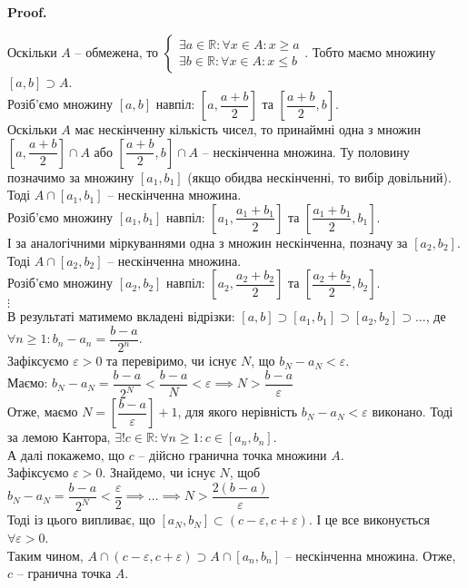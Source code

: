 \documentclass[a4paper, 14pt]{article}
\makeatletter
\def\qed{$\blacksquare$}
\theoremstyle{theoremdd}
\theoremstyle{theoremdd}
\theoremstyle{theoremdd}
\theoremstyle{theoremdd}
\theoremstyle{theoremdd}
\theoremstyle{theoremdd}
\theoremstyle{theoremdd}
\theoremstyle{theoremdd}
\renewenvironment{proof}[1][Proof.\\]{\par
\pushQED{\hfill \qed}%
\normalfont \topsep6\p@\@plus6\p@\relax
\trivlist
\item\relax
{\bfseries
#1\@addpunct{.}}\hspace\labelsep\ignorespaces
}{%
\popQED\endtrivlist\@endpefalse
}
\makeatother
\begin{document}
	\begin{proof}
	Оскільки $A$ -- обмежена, то
	$\begin{cases} \exists a \in \mathbb{R}: \forall x \in A: x \geq a \\
	  \exists b \in \mathbb{R}: \forall x \in A: x \leq b \end{cases}$. Тобто маємо множину $[a,b] \supset A$.\\
	Розіб'ємо множину $[a,b]$ навпіл: $\left[a, \dfrac{a+b}{2}\right]$ та $\left[\dfrac{a+b}{2},b \right]$.\\
	Оскільки $A$ має нескінченну кількість чисел, то принаймні одна з множин $\left[a, \dfrac{a+b}{2}\right] \cap A$ або $\left[\dfrac{a+b}{2}, b\right] \cap A$ -- нескінченна множина. Ту половину позначимо за множину $[a_1,b_1]$ (якщо обидва нескінченні, то вибір довільний). Тоді $A \cap [a_1,b_1]$ -- нескінченна множина.\\
	Розіб'ємо множину $[a_1,b_1]$ навпіл: $\left[a_1, \dfrac{a_1+b_1}{2}\right]$ та $\left[\dfrac{a_1+b_1}{2},b_1 \right]$.\\
	І за аналогічними міркуваннями одна з множин нескінченна, позначу за $[a_2,b_2]$. Тоді $A \cap [a_2,b_2]$ -- нескінченна множина.\\
	Розіб'ємо множину $[a_2,b_2]$ навпіл: $\left[a_2, \dfrac{a_2+b_2}{2}\right]$ та $\left[\dfrac{a_2+b_2}{2},b_2 \right]$.\\
	$\vdots$\\
	В результаті матимемо вкладені відрізки: $[a,b] \supset [a_1,b_1] \supset [a_2,b_2] \supset \dots$, де $\forall n \geq 1: b_n - a_n = \dfrac{b-a}{2^n}$.\\
	Зафіксуємо $\varepsilon > 0$ та перевіримо, чи існує $N$, що $b_N - a_N < \varepsilon$.\\
	Маємо: $b_N - a_N = \dfrac{b-a}{2^N} < \dfrac{b-a}{N} < \varepsilon \implies N > \dfrac{b-a}{\varepsilon}$\\
	Отже, маємо $N = \left[ \dfrac{b-a}{\varepsilon} \right]+1$, для якого нерівність $b_N-a_N < \varepsilon$ виконано. Тоді за лемою Кантора, $\exists! c \in \mathbb{R}: \forall n \geq 1: c \in [a_n,b_n]$.
	\bigskip \\
	А далі покажемо, що $c$ -- дійсно гранична точка множини $A$.\\
	Зафіксуємо $\varepsilon > 0$. Знайдемо, чи існує $N$, щоб $b_N - a_N = \dfrac{b-a}{2^N} < \dfrac{\varepsilon}{2} \implies \dots \implies N > \dfrac{2(b-a)}{\varepsilon}$\\
	Тоді із цього випливає, що $[a_N,b_N] \subset (c-\varepsilon, c+\varepsilon)$. І це все виконується $\forall \varepsilon > 0$.\\
	Таким чином, $A \cap (c-\varepsilon, c+\varepsilon) \supset A \cap [a_n,b_n]$ -- нескінченна множина. Отже, $c$ -- гранична точка $A$.
	\end{proof}
	
\end{document}
